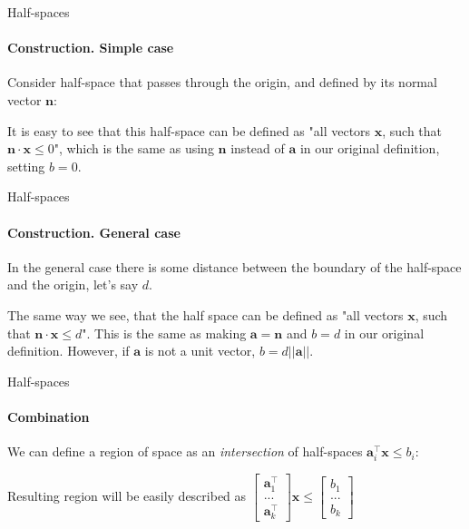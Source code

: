 \documentclass{beamer}
\begin{document}
\begin{frame}{Half-spaces}
\framesubtitle{Construction. Simple case}
\begin{flushleft}

Consider half-space that passes through the origin, and defined by its normal vector $\mathbf{n}$:



It is easy to see that this half-space can be defined as "all vectors $\mathbf{x}$, such that $\mathbf{n} \cdot \mathbf{x} \leq 0$", which is the same as using $\mathbf{n}$ instead of $\mathbf{a}$ in our original definition, setting $b = 0$.
 
\end{flushleft}
\end{frame}




\begin{frame}{Half-spaces}
\framesubtitle{Construction. General case}
\begin{flushleft}

In the general case there is some distance between the boundary of the half-space and the origin, let's say $d$.



The same way we see, that the half space can be defined as "all vectors $\mathbf{x}$, such that $\mathbf{n} \cdot \mathbf{x} \leq d$". This is the same as making $\mathbf{a} = \mathbf{n}$ and $b = d$ in our original definition. However, if $\mathbf{a}$ is not a unit vector, $b = d ||\mathbf{a}||$.
 
\end{flushleft}
\end{frame}



\begin{frame}{Half-spaces}
\framesubtitle{Combination}
\begin{flushleft}

We can define a region of space as an \emph{intersection} of half-spaces $\mathbf{a}_i^\top \mathbf{x} \leq b_i$:



Resulting region will be easily described as $\begin{bmatrix} \mathbf{a}_1^\top \\ ... \\ \mathbf{a}_k^\top \end{bmatrix} \mathbf{x} \leq \begin{bmatrix} b_1 \\ ... \\ b_k \end{bmatrix}$

 
\end{flushleft}
\end{frame}
\end{document}
